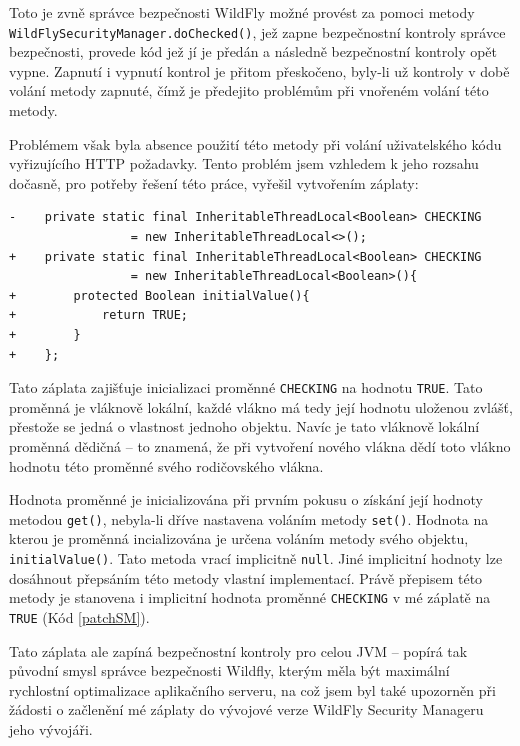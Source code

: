 Toto je zvně správce bezpečnosti WildFly možné provést za pomoci metody {\tt WildFlySecurityManager.doChecked()}, jež zapne bezpečnostní kontroly správce bezpečnosti, provede kód jež jí je předán a následně bezpečnostní kontroly opět vypne. Zapnutí i vypnutí kontrol je přitom přeskočeno, byly-li už kontroly v době volání metody zapnuté, čímž je předejito problémům při vnořeném volání této metody. \cite{sourceWildFlySecurityManager}

Problémem však byla absence použití této metody při volání uživatelského kódu vyřizujícího HTTP požadavky. Tento problém jsem vzhledem k jeho rozsahu dočasně, pro potřeby řešení této práce, vyřešil vytvořením záplaty:

\begin{lstlisting}[caption=Záplata správce bezpečnosti WildFly nastavující bezpečnostní kontroly na implicitně zapnuté, label=patchSM]
-    private static final InheritableThreadLocal<Boolean> CHECKING
                 = new InheritableThreadLocal<>();
+    private static final InheritableThreadLocal<Boolean> CHECKING
                 = new InheritableThreadLocal<Boolean>(){
+        protected Boolean initialValue(){
+            return TRUE;
+        }
+    };
\end{lstlisting}

Tato záplata zajišťuje inicializaci proměnné {\tt CHECKING} na hodnotu {\tt TRUE}. Tato proměnná je vláknově lokální, každé vlákno má tedy její hodnotu uloženou zvlášť, přestože se jedná o vlastnost jednoho objektu. Navíc je tato vláknově lokální proměnná dědičná -- to znamená, že při vytvoření nového vlákna dědí toto vlákno hodnotu této proměnné svého rodičovského vlákna. \cite{refInheritableThreadLocal}\cite{refThreadLocal}

Hodnota proměnné je inicializována při prvním pokusu o získání její hodnoty metodou {\tt get()}, nebyla-li dříve nastavena voláním metody {\tt set()}. Hodnota na kterou je proměnná incializována je určena voláním metody svého objektu, {\tt initialValue()}. Tato metoda vrací implicitně {\tt null}. Jiné implicitní hodnoty lze dosáhnout přepsáním této metody vlastní implementací. Právě přepisem této metody je stanovena i implicitní hodnota proměnné {\tt CHECKING} v mé záplatě na {\tt TRUE} (Kód \ref{patchSM}). \cite{refThreadLocal}

Tato záplata ale zapíná bezpečnostní kontroly pro celou JVM -- popírá tak původní smysl správce bezpečnosti Wildfly, kterým měla být maximální rychlostní optimalizace aplikačního serveru, na což jsem byl také upozorněn při žádosti o začlenění mé záplaty do vývojové verze WildFly Security Manageru jeho vývojáři. \cite{smPullRequest}

